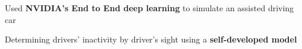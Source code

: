 \documentclass[]{deedy-resume-openfont}
\begin{document}
\begin{minipage}[t]{0.66\textwidth}
\begin{tightemize}
\item Used \textbf{NVIDIA's End to End deep learning} to simulate an assisted driving car\\
\item Determining drivers' inactivity by driver's sight using a \textbf{self-developed model}\\
\end{tightemize}








\end{minipage} 
\end{document}
